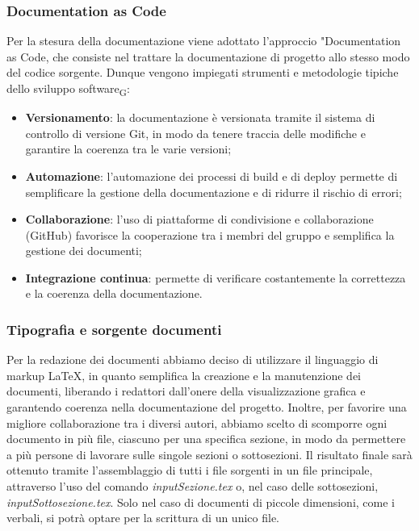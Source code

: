 \subsubsection{Documentation as Code}
Per la stesura della documentazione viene adottato l'approccio "Documentation as Code, che consiste nel trattare la documentazione di progetto
allo stesso modo del codice sorgente. Dunque vengono impiegati strumenti e metodologie tipiche dello sviluppo {software\textsubscript{G}}:
\begin{itemize}
    \item \textbf{Versionamento}: la documentazione è versionata tramite il sistema di controllo di versione Git, in modo da tenere traccia 
    delle modifiche e garantire la coerenza tra le varie versioni;
    \item \textbf{Automazione}: l'automazione dei processi di build e di deploy permette di semplificare la gestione della documentazione e 
    di ridurre il rischio di errori;
    \item \textbf{Collaborazione}: l'uso di piattaforme di condivisione e collaborazione (GitHub) favorisce la cooperazione tra i membri 
    del gruppo e semplifica la gestione dei documenti;
    \item \textbf{Integrazione continua}: permette di verificare costantemente la correttezza e la coerenza della documentazione.
\end{itemize} 

\subsubsection{Tipografia e sorgente documenti}
Per la redazione dei documenti abbiamo deciso di utilizzare il linguaggio di markup \LaTeX{}, in quanto semplifica la creazione e la manutenzione
dei documenti, liberando i redattori dall'onere della visualizzazione grafica e garantendo coerenza nella documentazione del progetto.
Inoltre, per favorire una migliore collaborazione tra i diversi autori, abbiamo scelto di scomporre ogni documento in più file,
ciascuno per una specifica sezione, in modo da permettere a più persone di lavorare sulle singole sezioni o sottosezioni.
Il risultato finale sarà ottenuto tramite l'assemblaggio di tutti i file sorgenti in un file principale, attraverso l'uso del comando 
\textit{input{Sezione.tex}} o, nel caso delle sottosezioni, \textit{input{Sottosezione.tex}}.
Solo nel caso di documenti di piccole dimensioni, come i verbali, si potrà optare per la scrittura di un unico file. 

